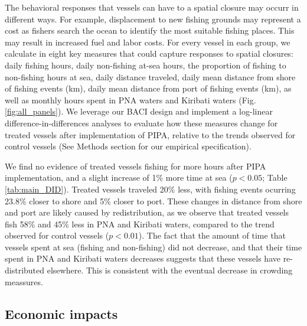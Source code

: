 \documentclass[9p,twocolumn,twoside,lineno]{pnas-new}
\begin{document}
The behavioral responses that vessels can have to a spatial closure may occurr in different ways. For example, displacement to new fishing grounds may represent a cost as fishers search the ocean to identify the most suitable fishing places. This may result in increased fuel and labor costs. For every vessel in each group, we calculate in eight key measures that could capture responses to spatial closures: daily fishing hours, daily non-fishing at-sea hours, the proportion of fishing to non-fishing hours at sea, daily distance traveled, daily mean distance from shore of fishing events (km), daily mean distance from port of fishing events (km), as well as monthly hours spent in PNA waters and Kiribati waters (Fig. \ref{fig:all_panels}). We leverage our BACI design and implement a log-linear difference-in-differences analyses to evaluate how these measures change for treated vessels after implementation of PIPA, relative to the trends observed for control vessels (See Methods section for our empirical specification).

We find no evidence of treated vessels fishing for more hours after PIPA implementation, and a slight increase of 1\% more time at sea ($p < 0.05$; Table \ref{tab:main_DID}). Treated vessels traveled 20\% less, with fishing events ocurring 23.8\% closer to shore and 5\% closer to port. These changes in distance from shore and port are likely caused by redistribution, as we observe that treated vessels fish 58\% and 45\% less in PNA and Kiribati waters, compared to the trend observed for control vessels ($p < 0.01$). The fact that the amount of time that vessels spent at sea (fishing and non-fishing) did not decrease, and that their time spent in PNA and Kiribati waters decreases suggests that these vessels have re-distributed elsewhere. This is consistent with the eventual decrease in crowding meassures.

\subsection{Economic impacts}
\end{document}
